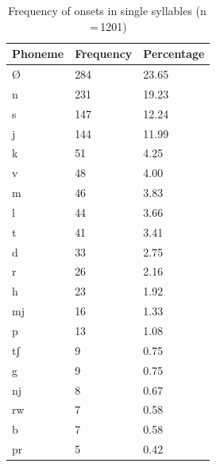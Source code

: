 %
\begin{table}[pth]\centering
\caption[Frequency of onsets in single syllables]{Frequency of onsets in single 
syllables (n\,=\,1201)}
\begin{tabu} to 0.5\linewidth{X X[c] X[c]}
\tableheaderfont\toprule
Phoneme
	& Frequency
	& Percentage
	\\
	
\toprule

Ø
	& 284
	& 23.65\pct
	\\

\midrule

n
	& 231
	& 19.23\pct
	\\

s
	& 147
	& 12.24\pct
	\\

j
	& 144
	& 11.99\pct
	\\

k
	& 51
	& 4.25\pct
	\\

v
	& 48
	& 4.00\pct
	\\

m
	& 46
	& 3.83\pct
	\\

l
	& 44
	& 3.66\pct
	\\

t
	& 41
	& 3.41\pct
	\\

d
	& 33
	& 2.75\pct
	\\

r
	& 26
	& 2.16\pct
	\\

h
	& 23
	& 1.92\pct
	\\

mj
	& 16
	& 1.33\pct
	\\

p
	& 13
	& 1.08\pct
	\\

tʃ
	& 9
	& 0.75\pct
	\\

g
	& 9
	& 0.75\pct
	\\

nj
	& 8
	& 0.67\pct
	\\

rw
	& 7
	& 0.58\pct
	\\

b
	& 7
	& 0.58\pct
	\\

pr
	& 5
	& 0.42\pct
	\\


\end{tabu}
\end{table}
